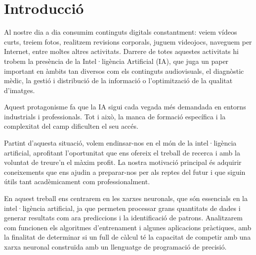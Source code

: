 \chapter{Introducció}
\label{c:intro}
Al nostre dia a dia consumim continguts digitals constantment: veiem vídeos curts, treiem fotos, realitzem revisions corporals, juguem videojocs, naveguem per Internet, entre moltes altres activitats. Darrere de totes aquestes activitats hi trobem la presència de la Intel·ligència Artificial (IA), que juga un paper important en àmbits tan diversos com els continguts audiovisuals, el diagnòstic mèdic, la gestió i distribució de la informació o l’optimització de la qualitat d’imatges.

Aquest protagonisme fa que la IA sigui cada vegada més demandada en entorns industrials i professionals. Tot i això, la manca de formació específica i la complexitat del camp dificulten el seu accés.

Partint d’aquesta situació, volem endinsar-nos en el món de la intel·ligència artificial, aprofitant l’oportunitat que ens ofereix el treball de recerca i amb la voluntat de treure’n el màxim profit. La nostra motivació principal és adquirir coneixements que ens ajudin a preparar-nos per als reptes del futur i que siguin útils tant acadèmicament com professionalment.

En aquest treball ens centrarem en les xarxes neuronals, que són essencials en la intel·ligència artificial, ja que permeten processar grans quantitats de dades i generar resultats com ara prediccions i la identificació de patrons. Analitzarem com funcionen els algoritmes d’entrenament i algunes aplicacions pràctiques, amb la finalitat de determinar si un full de càlcul té la capacitat de competir amb una xarxa neuronal construïda amb un llenguatge de programació de precisió.


\clearpage
